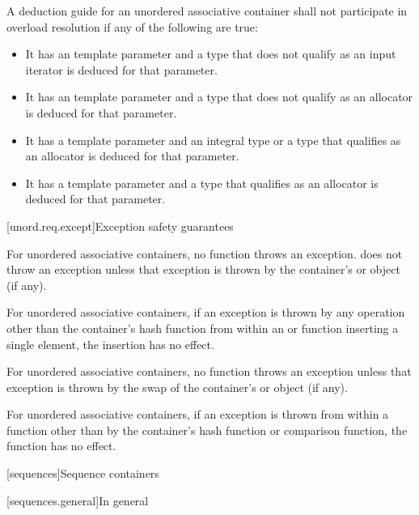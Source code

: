 \pnum
A deduction guide for an unordered associative container shall not participate in overload resolution
if any of the following are true:
\begin{itemize}
\item It has an  template parameter
and a type that does not qualify as an input iterator is deduced for that parameter.

\item It has an  template parameter
and a type that does not qualify as an allocator is deduced for that parameter.

\item It has a  template parameter
and an integral type or a type that qualifies as an allocator is deduced for that parameter.

\item It has a  template parameter
and a type that qualifies as an allocator is deduced for that parameter.
\end{itemize}

[unord.req.except]{Exception safety guarantees}

\pnum
{}%
%
For unordered associative containers, no  function
throws an exception.  does not throw an
exception unless that exception is thrown by the container's  or
 object (if any).

\pnum
For unordered associative containers, if an exception is thrown by any
operation other than the container's hash function from within an
 or  function inserting a single element,
the insertion has no effect.

\pnum
For unordered associative containers, no  function throws
an exception unless that exception is thrown by the swap of the container's
 or  object (if any).

\pnum
{}%
%
For unordered associative containers, if an exception is thrown
from within a  function other than by the container's hash
function or comparison function, the  function has no effect.

[sequences]{Sequence containers}

[sequences.general]{In general}

